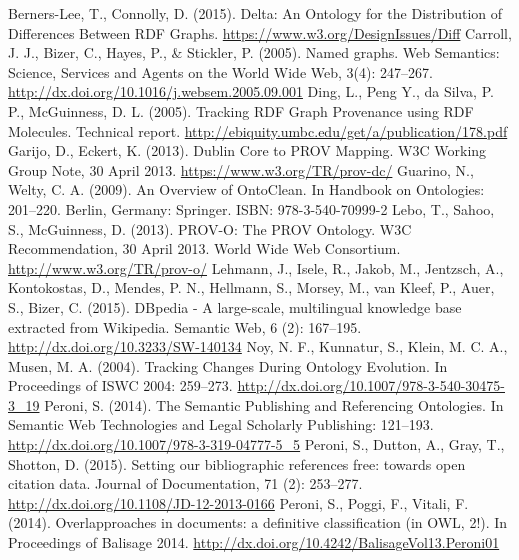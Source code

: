 \documentclass[runningheads,a4paper]{llncs}
\begin{document}
\begin{thebibliography}{4}

 Berners-Lee, T., Connolly, D. (2015). Delta: An Ontology for the Distribution of Differences Between RDF Graphs. \url{https://www.w3.org/DesignIssues/Diff}
 Carroll, J. J., Bizer, C., Hayes, P., \& Stickler, P. (2005). Named graphs. Web Semantics: Science, Services and Agents on the World Wide Web, 3(4): 247--267. \url{http://dx.doi.org/10.1016/j.websem.2005.09.001}
 Ding, L., Peng Y., da Silva, P. P., McGuinness, D. L. (2005). Tracking RDF Graph Provenance using RDF Molecules. Technical report. \url{http://ebiquity.umbc.edu/get/a/publication/178.pdf}
 Garijo, D., Eckert, K. (2013). Dublin Core to PROV Mapping. W3C Working Group Note, 30 April 2013. \url{https://www.w3.org/TR/prov-dc/}
 Guarino, N., Welty, C. A. (2009). An Overview of OntoClean. In Handbook on Ontologies: 201--220. Berlin, Germany: Springer. ISBN: 978-3-540-70999-2
 Lebo, T., Sahoo, S., McGuinness, D. (2013). PROV-O: The PROV Ontology. W3C Recommendation, 30 April 2013. World Wide Web Consortium. \url{http://www.w3.org/TR/prov-o/}
 Lehmann, J., Isele, R., Jakob, M., Jentzsch, A., Kontokostas, D., Mendes, P. N., Hellmann, S., Morsey, M., van Kleef, P., Auer, S., Bizer, C. (2015). DBpedia - A large-scale, multilingual knowledge base extracted from Wikipedia. Semantic Web, 6 (2): 167--195. \url{http://dx.doi.org/10.3233/SW-140134}
 Noy, N. F., Kunnatur, S., Klein, M. C. A., Musen, M. A. (2004). Tracking Changes During Ontology Evolution. In Proceedings of ISWC 2004: 259--273. \url{http://dx.doi.org/10.1007/978-3-540-30475-3\_19}
 Peroni, S. (2014). The Semantic Publishing and Referencing Ontologies. In Semantic Web Technologies and Legal Scholarly Publishing: 121--193. \url{http://dx.doi.org/10.1007/978-3-319-04777-5\_5}
 Peroni, S., Dutton, A., Gray, T., Shotton, D. (2015). Setting our bibliographic references free: towards open citation data. Journal of Documentation, 71 (2): 253--277. \url{http://dx.doi.org/10.1108/JD-12-2013-0166}
 Peroni, S., Poggi, F., Vitali, F. (2014). Overlapproaches in documents: a definitive classification (in OWL, 2!). In Proceedings of Balisage 2014. \url{http://dx.doi.org/10.4242/BalisageVol13.Peroni01}

\end{thebibliography}
\end{document}

